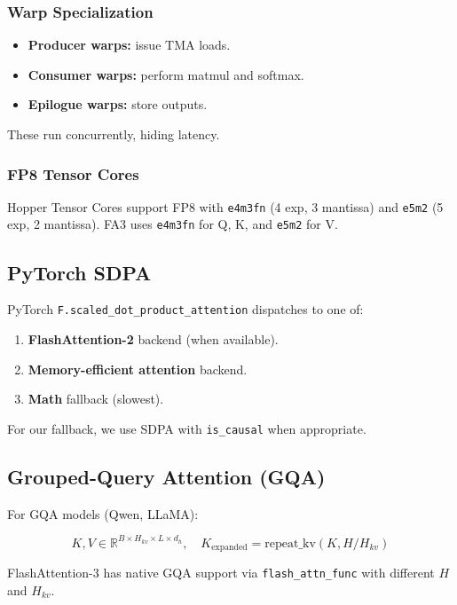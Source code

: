 \subsubsection{Warp Specialization}

\begin{itemize}
\item \textbf{Producer warps:} issue TMA loads.
\item \textbf{Consumer warps:} perform matmul and softmax.
\item \textbf{Epilogue warps:} store outputs.

\end{itemize}
These run concurrently, hiding latency.

\subsubsection{FP8 Tensor Cores}

Hopper Tensor Cores support FP8 with \texttt{e4m3fn} (4 exp, 3 mantissa) and 
\texttt{e5m2} (5 exp, 2 mantissa). FA3 uses \texttt{e4m3fn} for Q, K, and \texttt{e5m2} 
for V.

\subsection{PyTorch SDPA}

PyTorch \texttt{F.scaled\_dot\_product\_attention} dispatches to one of:

\begin{enumerate}
\item \textbf{FlashAttention-2} backend (when available).
\item \textbf{Memory-efficient attention} backend.
\item \textbf{Math} fallback (slowest).

\end{enumerate}
For our fallback, we use SDPA with \texttt{is\_causal} when appropriate.

\subsection{Grouped-Query Attention (GQA)}

For GQA models (Qwen, LLaMA):

\[
K, V \in \mathbb{R}^{B \times H_{kv} \times L \times d_h}, \quad
K_\text{expanded} = \text{repeat\_kv}(K, H / H_{kv})
\tag{3.6}
\]

FlashAttention-3 has native GQA support via \texttt{flash\_attn\_func} with different 
$H$ and $H_{kv}$.

